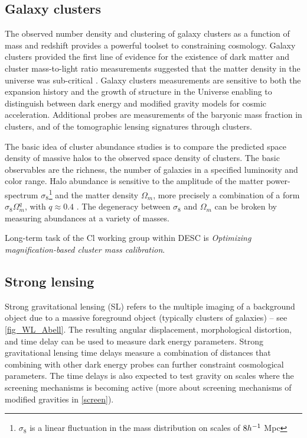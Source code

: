\subsection{Galaxy clusters}
The observed number density and clustering of galaxy clusters as a function of mass and redshift provides a powerful toolset to constraining cosmology.  Galaxy clusters provided the first line of evidence for the existence of dark matter \textcite{zwicky} and cluster mass-to-light ratio measurements suggested that the matter density in the universe was sub-critical \textcite{Gott}. Galaxy clusters measurements are sensitive to both the expansion history and the growth of structure in the Universe enabling to distinguish between dark energy and modified gravity models for cosmic acceleration. Additional probes are measurements of the baryonic mass fraction in clusters, and of the tomographic lensing signatures through clusters.

The basic idea of cluster abundance studies is to compare the predicted space density of massive halos to the observed space density of clusters. The basic observables are the richness, the number of galaxies in a specified luminosity and color range. Halo abundance is sensitive to the amplitude of the matter power-spectrum $\sigma_8$\footnote{$\sigma_8$ is a linear fluctuation in the mass distribution on scales of $8h^{-1}$ Mpc} and the matter density $\Omega_m$, more precisely a combination of a form $\sigma_8\Omega_m^q$, with $q\approx0.4$ \textcite{white}. The degeneracy between $\sigma_8$ and $\Omega_m$ can be broken by measuring abundances at a variety of masses.

Long-term task of the Cl working group within DESC is \textit{Optimizing magnification-based cluster mass calibration}.
\subsection{Strong lensing}
Strong gravitational lensing (SL) refers to the multiple imaging of a background object due to a massive foreground object (typically clusters of galaxies) -- see \autoref{fig_WL_Abell}. The resulting angular displacement, morphological distortion, and time delay can be used to measure dark energy parameters. Strong gravitational lensing time delays measure a combination of distances that combining with other dark energy probes can further constraint cosmological parameters. The time delays is also expected to test gravity on scales where the screening mechanisms is becoming active (more about screening mechanisms of modified gravities in \autoref{screen}).

